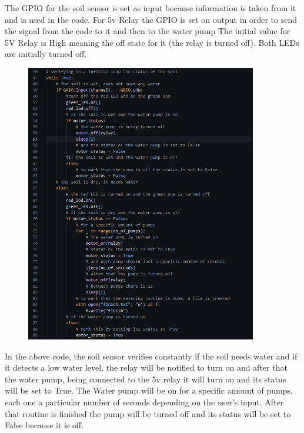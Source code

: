 \documentclass[12pt]{article}
\begin{document}
\newpage

The GPIO for the soil sensor is set as input because information is taken from it and is used in the code. For 5v Relay the GPIO is set on output in order to send the signal from the code to it and then to the water pump
The initial value for 5V Relay is High meaning the off state for it (the relay is turned off). Both LEDs are initially turned off.\\

\begin{figure}[ht]
    \centering
    \includegraphics[width=0.9\textwidth]{images/image22.png}
    \label{fig:pic21}
\end{figure} 

In the above code, the soil sensor verifies constantly if the soil needs water and if it detects a low water level, the relay will be notified to turn on and after that the water pump, being connected to the 5v relay it will turn on and its status will be set to True. The Water pump will be on for a specific amount of pumps, each one a particular number of seconds depending on the user’s input. After that routine is finished the pump will be turned off and its status will be set to False because it is off.

\newpage


\nocite{*} %



\end{document}

